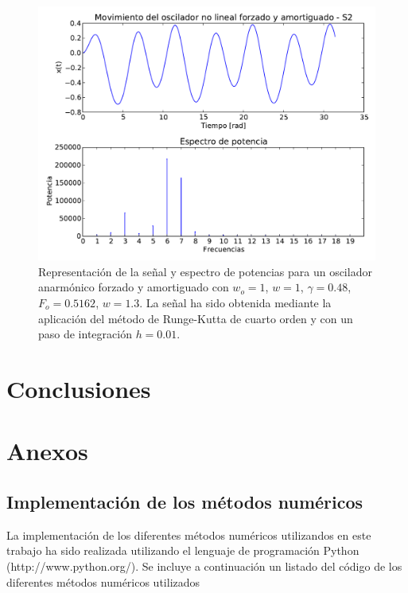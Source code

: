 \documentclass[11pt]{article}
\begin{document}
\begin{figure}[h]
\centering
\includegraphics[width=0.75\linewidth]{caso_anarmonico_s2.pdf}
\caption{Representación de la señal y espectro de potencias para un oscilador anarmónico forzado y amortiguado con $w_o = 1$, $w = 1$, $\gamma = 0.48$, $F_o = 0.5162$, $w = 1.3$. La señal ha sido obtenida mediante la aplicación del método de Runge-Kutta de cuarto orden y con un paso de integración $h = 0.01$.}
\label{fig:caso_anarmonico_s2}
\end{figure}

\section{Conclusiones}

\section{Anexos}

\subsection{Implementación de los métodos numéricos}
La implementación de los diferentes métodos numéricos utilizandos en este trabajo ha sido realizada utilizando el lenguaje de programación Python (http://www.python.org/). Se incluye a continuación un listado del código de los diferentes métodos numéricos utilizados
\end{document}
